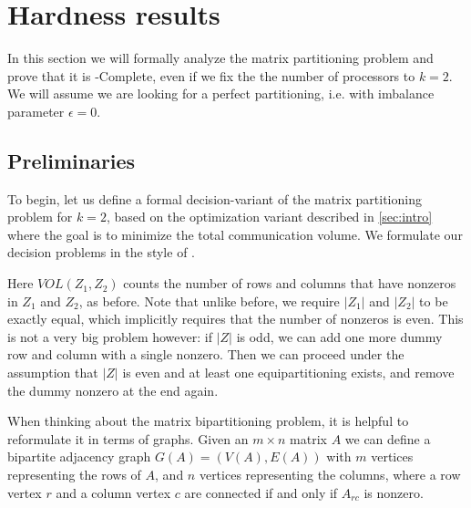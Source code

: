 	\section{Hardness results}
	\label{sec:np}
	In this section we will formally analyze the matrix partitioning
	problem and prove that it is \NP-Complete, even if we fix the
	the number of processors to $k = 2$. We will assume we are looking
	for a perfect partitioning, i.e. with imbalance parameter $\epsilon = 0$.

	\subsection{Preliminaries}
	\label{1-preliminaries}
	To begin, let us define a formal decision-variant of the matrix
	partitioning problem for $k = 2$, based on the optimization
	variant described in \autoref{sec:intro} where the goal
	is to minimize the total communication volume. We formulate our
	decision problems in the style of \cite{garey79}.

	\begin{problem}
		\problemtitle{\mbpt}
	\end{problem}

	Here $VOL(Z_1, Z_2)$ counts the number of rows and columns that
	have nonzeros in $Z_1$ and $Z_2$, as before. Note that unlike before,
	we require $|Z_1|$ and $|Z_2|$ to be exactly equal, which implicitly
	requires that the number of nonzeros is even. This is not a very big
	problem however: if $|Z|$ is odd, we can add one more dummy row and column
	with a single nonzero. Then we can proceed under the assumption that $|Z|$
	is even and at least one equipartitioning exists, and remove the dummy
	nonzero at the end again.

	When thinking about the matrix bipartitioning problem, it is helpful
	to reformulate it in terms of graphs. Given an $m \times n$ matrix $A$
	we can define a bipartite adjacency graph $G(A) = (V(A), E(A))$ with
	$m$ vertices representing the rows of $A$, and $n$ vertices representing
	the columns, where a row vertex $r$ and a column vertex $c$ are connected
	if and only if $A_{rc}$ is nonzero.

